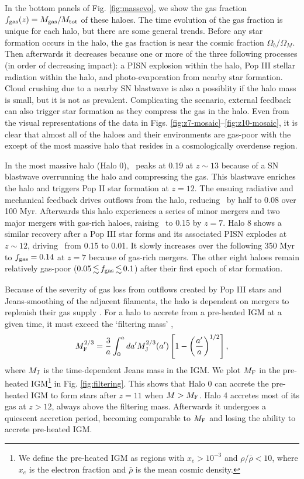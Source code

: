 \documentclass[useAMS,usenatbib]{mn2e}
\begin{document}
In the bottom panels of Fig. \ref{fig:massevo}, we show the gas
fraction $f_{\rm gas}(z) = M_{\rm gas} / M_{\rm tot}$ of these haloes.
The time evolution of the gas fraction is unique for each halo, but
there are some general trends.  Before any star formation occurs in
the halo, the gas fraction is near the cosmic fraction $\Omega_b /
\Omega_M$.  Then afterwards it decreases because one or more of the
three following processes (in order of decreasing impact): a PISN
explosion within the halo, Pop III stellar radiation within the halo,
and photo-evaporation from nearby star formation.  Cloud crushing due
to a nearby SN blastwave is also a possiblity if the halo mass is
small, but it is not as prevalent.  Complicating the scenario,
external feedback can also trigger star formation as they compress the
gas in the halo.  Even from the visual representations of the data in
Figs. \ref{fig:z7-mosaic}--\ref{fig:z10-mosaic}, it is clear that
almost all of the haloes and their environments are gas-poor with the
except of the most massive halo that resides in a cosmologically
overdense region.

In the most massive halo (Halo 0), \fgas~peaks at 0.19 at $z \sim 13$
because of a SN blastwave overrunning the halo and compressing the
gas.  This blastwave enriches the halo and triggers Pop II star
formation at $z=12$.  The ensuing radiative and mechanical feedback
drives outflows from the halo, reducing \fgas~by half to 0.08 over 100
Myr.  Afterwards this halo experiences a series of minor mergers and
two major mergers with gas-rich haloes, raising \fgas~to 0.15 by
$z=7$.  Halo 8 shows a similar recovery after a Pop III star forms and
its associated PISN explodes at $z \sim 12$, driving \fgas~from 0.15
to 0.01.  It slowly increases over the following 350 Myr to $\fgas =
0.14$ at $z=7$ because of gas-rich mergers.  The other eight haloes
remain relatively gas-poor ($0.05 \la \fgas \la 0.1$) after their
first epoch of star formation.

Because of the severity of gas loss from outflows created by Pop III
stars and Jeans-smoothing of the adjacent filaments, the halo is
dependent on mergers to replenish their gas supply
\citep[cf.][]{Yoshida07, Wise08_Gal, Greif10}.  For a halo to accrete
from a pre-heated IGM at a given time, it must exceed the `filtering
mass' \citep{Hui98, Gnedin00},
%
\begin{equation}
  \label{eqn:filtering}
  M_{\rm F}^{2/3} = \frac{3}{a} \int^a_0 da^\prime M_{\rm J}^{2/3}(a^\prime)
  \left[ 1 - \left(\frac{a^\prime}{a}\right)^{1/2} \right],
\end{equation}
where $M_{\rm J}$ is the time-dependent Jeans mass in the IGM.  We
plot $M_{\rm F}$ in the pre-heated IGM\footnote{We define the
  pre-heated IGM as regions with $x_e > 10^{-3}$ and $\rho/\bar{\rho}
  < 10$, where $x_e$ is the electron fraction and $\bar{\rho}$ is the
  mean cosmic density.} in Fig. \ref{fig:filtering}.  This shows that
Halo 0 can accrete the pre-heated IGM to form stars after $z=11$ when
$M > M_{\rm F}$.  Halo 4 accretes most of its gas at $z>12$, always
above the filtering mass.  Afterwards it undergoes a quiescent
accretion period, becoming comparable to $M_{\rm F}$ and losing the
ability to accrete pre-heated IGM.
\end{document}
